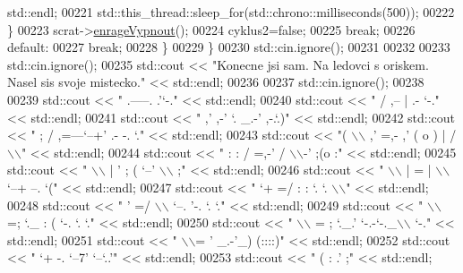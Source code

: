 \begin{DoxyCode}
      std::endl;
00221                         std::this\_thread::sleep\_for(std::chrono::milliseconds(500));
00222                     \}
00223                     scrat->\hyperlink{classIceAge_1_1Veverka_a1899ce1f8542829ec12e9087df188be8}{enrageVypnout}();
00224                     cyklus2=\textcolor{keyword}{false};
00225                     \textcolor{keywordflow}{break};
00226                 \textcolor{keywordflow}{default}:
00227                     \textcolor{keywordflow}{break};
00228             \}
00229     \}
00230     std::cin.ignore();
00231 
00232 
00233     std::cin.ignore();
00235     std::cout << \textcolor{stringliteral}{"Konecne jsi sam. Na ledovci s oriskem. Nasel sis svoje mistecko."} << std::endl;
00236 
00237     std::cin.ignore();
00238 
00239 std::cout << \textcolor{stringliteral}{"     .-----.            .'`-."} << std::endl;
00240 std::cout << \textcolor{stringliteral}{"    /      ,--          | .- `-."} << std::endl;
00241 std::cout << \textcolor{stringliteral}{"  ,'    ,-'   `.     \_.-'  ,-.`.)"} << std::endl;
00242 std::cout << \textcolor{stringliteral}{" ;     /   ,=---`--+'     .- -. `."} << std::endl;
00243 std::cout << \textcolor{stringliteral}{"(   \(\backslash\)\(\backslash\)    ,'   =,- ,'     ( o ) | /\(\backslash\)\(\backslash\)"} << std::endl;
00244 std::cout << \textcolor{stringliteral}{" :   :  /  =,-'  /        \(\backslash\)\(\backslash\)-'  ;(o :"} << std::endl;
00245 std::cout << \textcolor{stringliteral}{"  \(\backslash\)\(\backslash\)  |     '    ;  (       `--'  \(\backslash\)\(\backslash\) ;"} << std::endl;
00246 std::cout << \textcolor{stringliteral}{"   \(\backslash\)\(\backslash\) |        = |  \(\backslash\)\(\backslash\)`--+   --.    `("} << std::endl;
00247 std::cout << \textcolor{stringliteral}{"    `+       =/ :   :   `.    `.    \(\backslash\)\(\backslash\)"} << std::endl;
00248 std::cout << \textcolor{stringliteral}{"     '      =/   \(\backslash\)\(\backslash\)   `--. '-.   `.   `."} << std::endl;
00249 std::cout << \textcolor{stringliteral}{"      \(\backslash\)\(\backslash\)    =;     `.\_    : ( `-.  `.   `."} << std::endl;
00250 std::cout << \textcolor{stringliteral}{"       \(\backslash\)\(\backslash\)  = ;        `.\_.'  `-.-`-.\_\(\backslash\)\(\backslash\)    `-."} << std::endl;
00251 std::cout << \textcolor{stringliteral}{"        \(\backslash\)\(\backslash\)= '                   \_.-'\_)  (::::)"} << std::endl;
00252 std::cout << \textcolor{stringliteral}{"         `+      -.           `--7'  `--`..'"} << std::endl;
00253 std::cout << \textcolor{stringliteral}{"          (        :    .'       ;"} << std::endl;

\end{DoxyCode}
